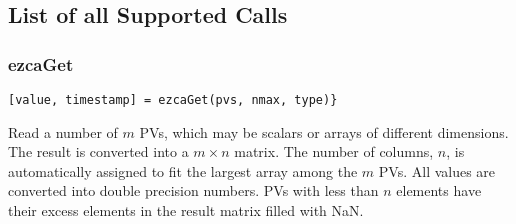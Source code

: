 \documentclass{article}
\newcommand{\NAN}{\mbox{NaN}}
\begin{document}
\vspace*{\fill}

\subsection{List of all Supported Calls}
\subsubsection{ezcaGet}
\label{ezcaget}
\begin{verbatim}
[value, timestamp] = ezcaGet(pvs, nmax, type)}
\end{verbatim}
Read a number of $m$ PVs, which may be scalars or arrays of
different dimensions. The result is converted into a $m\times n$
matrix. The number of columns, $n$, is automatically assigned
to fit the largest array among the $m$ PVs. All values are
converted into double precision numbers. PVs with less than
$n$ elements have their excess elements in the result matrix
filled with \NAN.
\end{document}
